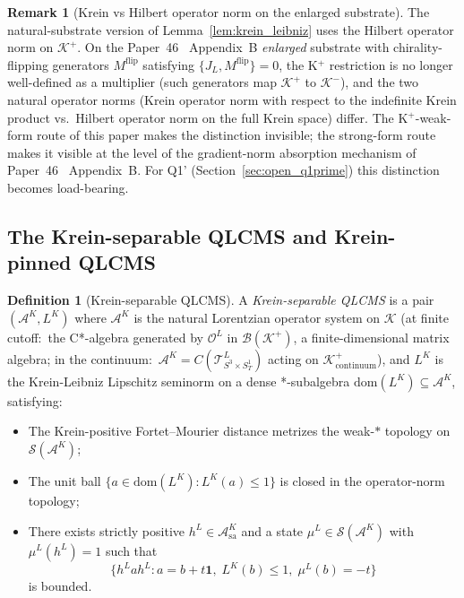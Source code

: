 \documentclass[11pt,a4paper]{article}
\theoremstyle{plain}
\theoremstyle{definition}
\newtheorem{definition}[theorem]{Definition}
\newtheorem{remark}[theorem]{Remark}
\newcommand{\Manifold}{S^{3}\times S^{1}_{T}}
\newcommand{\Krein}{\mathcal{K}}
\newcommand{\Op}{\mathcal{O}}
\newcommand{\Acal}{\mathcal{A}}
\newcommand{\Tcal}{\mathcal{T}}
\newcommand{\Bcal}{\mathcal{B}}
\newcommand{\Scal}{\mathcal{S}}
\newcommand{\JL}{J_{L}}
\newcommand{\Kplus}{\Krein^{+}}
\newcommand{\Kminus}{\Krein^{-}}
\begin{document}
\begin{remark}[Krein vs Hilbert operator norm on the enlarged
substrate]\label{rem:krein_op_norm}
The natural-substrate version of Lemma~\ref{lem:krein_leibniz} uses
the Hilbert operator norm on $\Kplus$. On the Paper~46~\cite{paper46}
Appendix~B \emph{enlarged} substrate with chirality-flipping
generators $M^{\mathrm{flip}}$ satisfying $\{\JL, M^{\mathrm{flip}}\} = 0$,
the K$^{+}$ restriction is no longer well-defined as a multiplier
(such generators map $\Kplus$ to $\Kminus$), and the two natural
operator norms (Krein operator norm with respect to the indefinite
Krein product vs.\ Hilbert operator norm on the full Krein space)
differ. The K$^{+}$-weak-form route of this paper makes the
distinction invisible; the strong-form route makes it visible at the
level of the gradient-norm absorption mechanism of
Paper~46~\cite{paper46} Appendix~B. For Q1' (Section~\ref{sec:open_q1prime})
this distinction becomes load-bearing.
\end{remark}

\subsection{The Krein-separable QLCMS and Krein-pinned QLCMS}\label{sec:krein_sep_pinned}

\begin{definition}[Krein-separable QLCMS]\label{def:krein_sep_qlcms}
A \emph{Krein-separable QLCMS} is a pair $(\Acal^{K}, L^{K})$ where
$\Acal^{K}$ is the natural Lorentzian operator system on $\Krein$
(at finite cutoff:\ the C*-algebra generated by $\Op^{L}$ in
$\Bcal(\Kplus)$, a finite-dimensional matrix algebra; in the
continuum:\ $\Acal^{K} = C(\Tcal^{L}_{\Manifold})$ acting on
$\Kplus_{\mathrm{continuum}}$), and $L^{K}$ is the Krein-Leibniz
Lipschitz seminorm on a dense *-subalgebra
$\mathrm{dom}(L^{K}) \subseteq \Acal^{K}$, satisfying:
\begin{itemize}
\item[(FM-K)] The Krein-positive Fortet--Mourier distance metrizes
the weak-$*$ topology on $\Scal(\Acal^{K})$;
\item[(CB-K)] The unit ball $\{a \in \mathrm{dom}(L^{K}) : L^{K}(a)
\le 1\}$ is closed in the operator-norm topology;
\item[(B-K)] There exists strictly positive $h^{L} \in \Acal^{K}_{\mathrm{sa}}$
and a state $\mu^{L} \in \Scal(\Acal^{K})$ with $\mu^{L}(h^{L}) = 1$
such that
\[
\{h^{L} a h^{L} : a = b + t\mathbf{1},\;
L^{K}(b) \le 1,\; \mu^{L}(b) = -t\}
\]
is bounded.
\end{itemize}
\end{definition}
\end{document}
